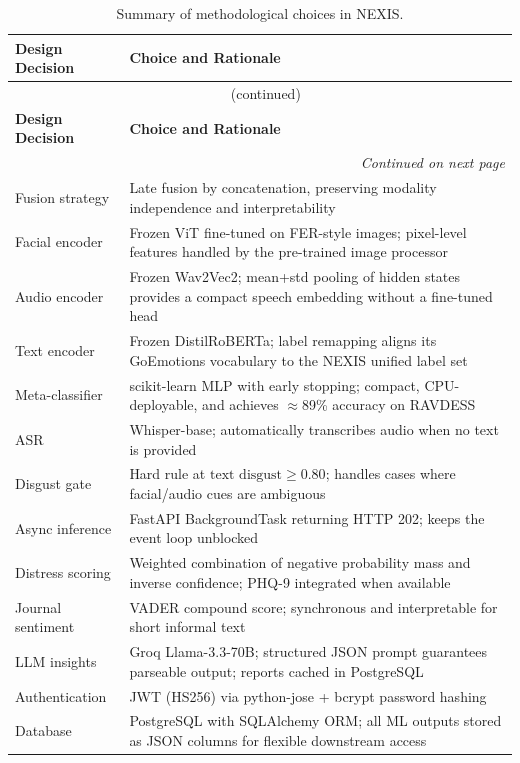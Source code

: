 \documentclass[12pt,a4paper]{article}
\begin{document}
\begin{longtable}{p{4.5cm} p{9cm}}
\caption{Summary of methodological choices in NEXIS.}
\label{tab:summary} \\
\toprule
\textbf{Design Decision} & \textbf{Choice and Rationale} \\
\midrule
\endfirsthead
\multicolumn{2}{c}{\tablename~\thetable{} (continued)}\\
\toprule
\textbf{Design Decision} & \textbf{Choice and Rationale} \\
\midrule
\endhead
\midrule
\multicolumn{2}{r}{\textit{Continued on next page}}\\
\endfoot
\bottomrule
\endlastfoot
Fusion strategy & Late fusion by concatenation, preserving modality independence and interpretability \\
Facial encoder & Frozen ViT fine-tuned on FER-style images; pixel-level features handled by the pre-trained image processor \\
Audio encoder & Frozen Wav2Vec2; mean+std pooling of hidden states provides a compact speech embedding without a fine-tuned head \\
Text encoder & Frozen DistilRoBERTa; label remapping aligns its GoEmotions vocabulary to the NEXIS unified label set \\
Meta-classifier & scikit-learn MLP with early stopping; compact, CPU-deployable, and achieves $\approx$89\% accuracy on RAVDESS \\
ASR & Whisper-base; automatically transcribes audio when no text is provided \\
Disgust gate & Hard rule at $\text{text disgust} \geq 0.80$; handles cases where facial/audio cues are ambiguous \\
Async inference & FastAPI BackgroundTask returning HTTP 202; keeps the event loop unblocked \\
Distress scoring & Weighted combination of negative probability mass and inverse confidence; PHQ-9 integrated when available \\
Journal sentiment & VADER compound score; synchronous and interpretable for short informal text \\
LLM insights & Groq Llama-3.3-70B; structured JSON prompt guarantees parseable output; reports cached in PostgreSQL \\
Authentication & JWT (HS256) via python-jose + bcrypt password hashing \\
Database & PostgreSQL with SQLAlchemy ORM; all ML outputs stored as JSON columns for flexible downstream access \\
\end{longtable}
\end{document}

